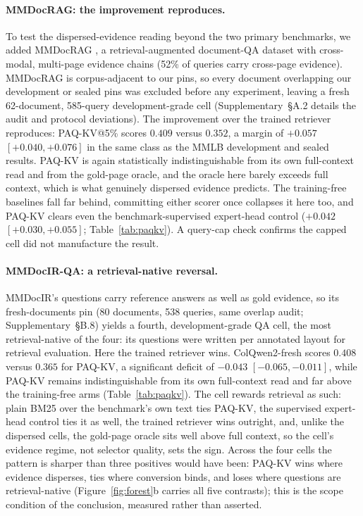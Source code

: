 \documentclass[letterpaper]{article} %
\newcommand{\paqc}{\textsc{PAQ-KV}}
\begin{document}
\paragraph{MMDocRAG: the improvement reproduces.}\label{sec:results-mmdocrag}
To test the dispersed-evidence reading beyond the two primary benchmarks, we
added MMDocRAG \citep{dong2025mmdocrag}, a retrieval-augmented document-QA
dataset with cross-modal, multi-page evidence chains (52\% of queries carry
cross-page evidence). MMDocRAG is corpus-adjacent to our pins, so every
document overlapping our development or sealed pins was excluded before any
experiment, leaving a fresh 62-document, 585-query development-grade cell
(Supplementary~\S A.2 details the audit and protocol deviations). The improvement over the trained
retriever reproduces: \paqc{}@5\% scores $0.409$ versus $0.352$, a margin of
$+0.057$ $[+0.040,+0.076]$ in the same class as the MMLB
development and sealed results. \paqc{} is again statistically
indistinguishable from its own full-context read and from the gold-page
oracle, and the oracle here barely exceeds full context, which is what
genuinely dispersed evidence predicts. The training-free baselines fall far
behind, committing either scorer once collapses it here too, and \paqc{}
clears even the benchmark-supervised expert-head control ($+0.042$
$[+0.030,+0.055]$; Table~\ref{tab:paqkv}). A query-cap check confirms the capped cell did not manufacture the
result.

\paragraph{MMDocIR-QA: a retrieval-native reversal.}\label{sec:results-mmdocirqa}
MMDocIR's questions carry reference answers as well as gold evidence, so its
fresh-documents pin (80 documents, 538 queries, same overlap audit;
Supplementary~\S B.8) yields a fourth, development-grade QA cell, the most
retrieval-native of the four: its questions were written per annotated
layout for retrieval evaluation. Here the trained retriever wins.
ColQwen2-fresh scores $0.408$ versus $0.365$ for \paqc{}, a significant
deficit of $-0.043$ $[-0.065,-0.011]$, while \paqc{} remains
indistinguishable from its own full-context read and far above the
training-free arms (Table~\ref{tab:paqkv}). The cell rewards retrieval as
such: plain BM25 over the benchmark's own text ties \paqc{}, the supervised
expert-head control ties it as well, the trained retriever wins outright,
and, unlike the dispersed cells, the gold-page oracle sits well above full
context, so the cell's evidence regime, not selector quality, sets the sign.
Across the four cells the pattern is sharper than three positives would
have been: \paqc{} wins where evidence disperses, ties where conversion
binds, and loses where questions are retrieval-native
(Figure~\ref{fig:forest}b carries all five contrasts); this is the scope
condition of the conclusion, measured rather than asserted.
\end{document}
